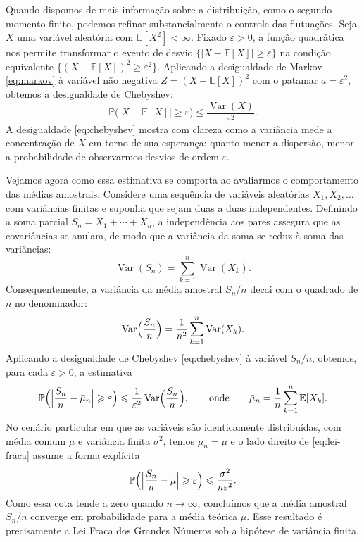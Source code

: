 \documentclass[12pt,portuguese]{article}
\theoremstyle{definition}
\theoremstyle{plainexercise}
\theoremstyle{starredexercise}
\theoremstyle{definition}
\begin{document}
Quando dispomos de mais informação sobre a distribuição, como o segundo momento
finito, podemos refinar substancialmente o controle das flutuações. Seja $X$
uma variável aleatória com $\mathbb{E}[X^2]<\infty$. Fixado $\varepsilon>0$,
a função quadrática nos permite transformar o evento de desvio
$\{|X-\mathbb{E}[X]|\geqslant\varepsilon\}$ na condição equivalente
$\{(X-\mathbb{E}[X])^2\geqslant\varepsilon^2\}$. Aplicando a desigualdade de
Markov \eqref{eq:markov} à variável não negativa $Z=(X-\mathbb{E}[X])^2$ com o
patamar $a=\varepsilon^2$, obtemos a desigualdade de Chebyshev:
\begin{equation}\label{eq:chebyshev}
\mathbb{P}\bigl(|X-\mathbb{E}[X]|\geqslant\varepsilon\bigr)
\leqslant
\frac{\operatorname{Var}(X)}{\varepsilon^2}.
\end{equation}
A desigualdade \eqref{eq:chebyshev} mostra com clareza como a variância mede a
concentração de $X$ em torno de sua esperança: quanto menor a dispersão, menor
a probabilidade de observarmos desvios de ordem $\varepsilon$.

Vejamos agora como essa estimativa se comporta ao avaliarmos o comportamento das
médias amostrais. Considere uma sequência de variáveis aleatórias $X_1,X_2,\ldots$
com variâncias finitas e suponha que sejam duas a duas independentes. Definindo a
soma parcial $S_n=X_1+\cdots+X_n$, a independência aos pares assegura que as
covariâncias se anulam, de modo que a variância da soma se reduz à soma das
variâncias:
\[
\operatorname{Var}(S_n)=\sum_{k=1}^{n}\operatorname{Var}(X_k).
\]
Consequentemente, a variância da média amostral $S_n/n$ decai com o quadrado de
$n$ no denominador:
\[
\operatorname{Var}\Bigl(\frac{S_n}{n}\Bigr)
=
\frac{1}{n^2}\sum_{k=1}^{n}\operatorname{Var}(X_k).
\]
Aplicando a desigualdade de Chebyshev \eqref{eq:chebyshev} à variável $S_n/n$,
obtemos, para cada $\varepsilon>0$, a estimativa
\begin{equation}\label{eq:lei-fraca}
\mathbb{P}\Bigl(\Bigl|\frac{S_n}{n}-\bar\mu_n\Bigr|\geqslant\varepsilon\Bigr)
\leqslant
\frac{1}{\varepsilon^2}\operatorname{Var}\Bigl(\frac{S_n}{n}\Bigr),
\qquad\text{onde}\qquad
\bar\mu_n=\frac{1}{n}\sum_{k=1}^{n}\mathbb{E}[X_k].
\end{equation}
No cenário particular em que as variáveis são identicamente distribuídas, com
média comum $\mu$ e variância finita $\sigma^2$, temos $\bar\mu_n=\mu$ e o lado
direito de \eqref{eq:lei-fraca} assume a forma explícita
\[
\mathbb{P}\Bigl(\Bigl|\frac{S_n}{n}-\mu\Bigr|\geqslant\varepsilon\Bigr)
\leqslant
\frac{\sigma^2}{n\varepsilon^2}.
\]
Como essa cota tende a zero quando $n\to\infty$, concluímos que a média amostral
$S_n/n$ converge em probabilidade para a média teórica $\mu$. Esse resultado é
precisamente a Lei Fraca dos Grandes Números sob a hipótese de variância finita.
\end{document}
